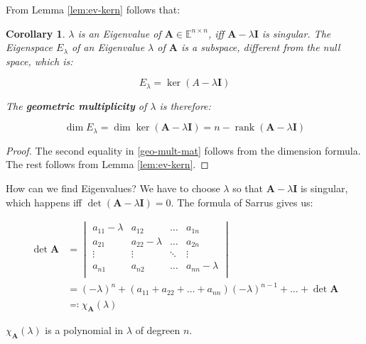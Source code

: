 \documentclass[a4paper,12pt]{article}
\newcommand{\E}{\mathbb{E}}
\newcommand{\I}{\mat{I}}
\newcommand{\A}{\mat{A}}
\newcommand{\rank}{\operatorname{rank}}
\newcommand{\Er}{E_{\lambda}}
\newcommand{\charp}[1]{\chi_{#1}}
\newcommand{\mat}[1]{\mathbf{#1}}
\theoremstyle{plain}
\newtheorem{corollary}[lemma]{Corollary}
\numberwithin{equation}{section}
\begin{document}
From Lemma \ref{lem:ev-kern} follows that:

\begin{corollary}
\label{er-mat}
    $\lambda$ is an Eigenvalue of $\A \in \E^{n \times n}$, iff $\A - \lambda \I$ is singular.
    The Eigenspace $\Er$ of an Eigenvalue $\lambda$ of $\A$ is a subspace,
    different from the null space, which is:

    \begin{equation}
        \Er = \ker (A - \lambda \I)
    \end{equation}

    The \textbf{geometric multiplicity} of $\lambda$ is therefore:

    \begin{equation}
    \label{geo-mult-mat}
        \dim \Er = \dim \ker (\A - \lambda \I) = n - \rank (\A - \lambda \I)
    \end{equation}
\end{corollary}

\begin{proof}
    The second equality in \ref{geo-mult-mat} follows from the dimension formula.
    The rest follows from Lemma \ref{lem:ev-kern}.
\end{proof}

How can we find Eigenvalues? We have to choose $\lambda$ so that $\A - \lambda \I$
is singular, which happens iff $\det (\A - \lambda \I) = 0$. The formula of
Sarrus gives us:

\begin{equation}
    \begin{split}
        \det \A &=
        \begin{vmatrix}
            a_{11} - \lambda & a_{12} & \dots  & a_{1n} \\
            a_{21} & a_{22} - \lambda & \dots  & a_{2n} \\
            \vdots & \vdots           & \ddots & \vdots \\
            a_{n1} & a_{n2}           & \dots  & a_{nn} - \lambda \\
        \end{vmatrix}
        \\[0.3cm]
        &= (-\lambda)^{n} + (a_{11} + a_{22} + \dots + a_{nn}) (-\lambda)^{n-1} + \dots + \det \A
        \\
        &\eqqcolon \charp{\A}(\lambda)
    \end{split}
\end{equation}

$\charp{\A}(\lambda)$ is a polynomial in $\lambda$ of degreen $n$.
\end{document}
